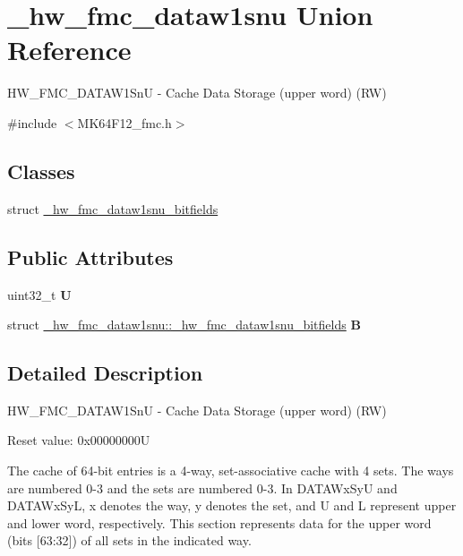 \hypertarget{union__hw__fmc__dataw1snu}{}\section{\+\_\+hw\+\_\+fmc\+\_\+dataw1snu Union Reference}
\label{union__hw__fmc__dataw1snu}


H\+W\+\_\+\+F\+M\+C\+\_\+\+D\+A\+T\+A\+W1\+SnU -\/ Cache Data Storage (upper word) (RW)  




{\ttfamily \#include $<$M\+K64\+F12\+\_\+fmc.\+h$>$}

\subsection*{Classes}
\begin{DoxyCompactItemize}
\item 
struct \hyperlink{struct__hw__fmc__dataw1snu_1_1__hw__fmc__dataw1snu__bitfields}{\+\_\+hw\+\_\+fmc\+\_\+dataw1snu\+\_\+bitfields}
\end{DoxyCompactItemize}
\subsection*{Public Attributes}
\begin{DoxyCompactItemize}
\item 
uint32\+\_\+t {\bfseries U}\hypertarget{union__hw__fmc__dataw1snu_a40eba9a0129e4708eb7decafe09e5751}{}\label{union__hw__fmc__dataw1snu_a40eba9a0129e4708eb7decafe09e5751}

\item 
struct \hyperlink{struct__hw__fmc__dataw1snu_1_1__hw__fmc__dataw1snu__bitfields}{\+\_\+hw\+\_\+fmc\+\_\+dataw1snu\+::\+\_\+hw\+\_\+fmc\+\_\+dataw1snu\+\_\+bitfields} {\bfseries B}\hypertarget{union__hw__fmc__dataw1snu_abe5c54122520d7e415e72db8ce36392e}{}\label{union__hw__fmc__dataw1snu_abe5c54122520d7e415e72db8ce36392e}

\end{DoxyCompactItemize}


\subsection{Detailed Description}
H\+W\+\_\+\+F\+M\+C\+\_\+\+D\+A\+T\+A\+W1\+SnU -\/ Cache Data Storage (upper word) (RW) 

Reset value\+: 0x00000000U

The cache of 64-\/bit entries is a 4-\/way, set-\/associative cache with 4 sets. The ways are numbered 0-\/3 and the sets are numbered 0-\/3. In D\+A\+T\+A\+Wx\+SyU and D\+A\+T\+A\+Wx\+SyL, x denotes the way, y denotes the set, and U and L represent upper and lower word, respectively. This section represents data for the upper word (bits \mbox{[}63\+:32\mbox{]}) of all sets in the indicated way. 

